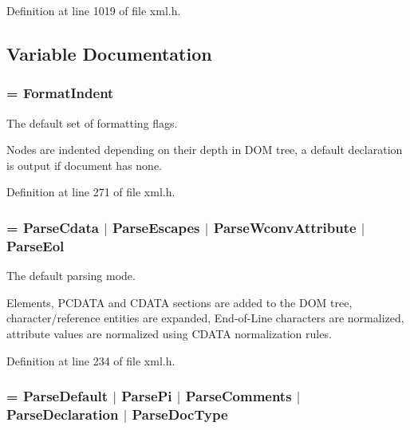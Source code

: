 Definition at line 1019 of file xml.h.



\subsection{Variable Documentation}
\hypertarget{namespacephys_1_1xml_a08bf6aab51f79929d9097706a5e64408}{
\subsubsection[{FormatDefault}]{ = {\bf FormatIndent}}}
\label{d9/d27/namespacephys_1_1xml_a08bf6aab51f79929d9097706a5e64408}


The default set of formatting flags. 

Nodes are indented depending on their depth in DOM tree, a default declaration is output if document has none. 

Definition at line 271 of file xml.h.

\hypertarget{namespacephys_1_1xml_aa6b8f7f8c2322fd683a235b498834d60}{
\subsubsection[{ParseDefault}]{ = {\bf ParseCdata} $|$ {\bf ParseEscapes} $|$ {\bf ParseWconvAttribute} $|$ {\bf ParseEol}}}
\label{d9/d27/namespacephys_1_1xml_aa6b8f7f8c2322fd683a235b498834d60}


The default parsing mode. 

Elements, PCDATA and CDATA sections are added to the DOM tree, character/reference entities are expanded, End-\/of-\/Line characters are normalized, attribute values are normalized using CDATA normalization rules. 

Definition at line 234 of file xml.h.

\hypertarget{namespacephys_1_1xml_af1c356f1eb063a63efebd6c8a5241c63}{
\subsubsection[{ParseFull}]{ = {\bf ParseDefault} $|$ {\bf ParsePi} $|$ {\bf ParseComments} $|$ {\bf ParseDeclaration} $|$ {\bf ParseDocType}}}
\label{d9/d27/namespacephys_1_1xml_af1c356f1eb063a63efebd6c8a5241c63}


